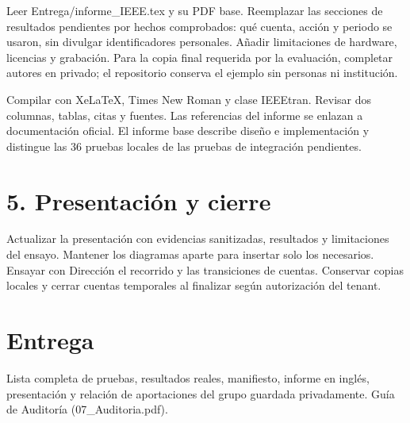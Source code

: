 \documentclass[12pt,a4paper]{article}
\begin{document}
Leer \textnormal{Entrega/\allowbreak{}informe\_\allowbreak{}IEEE.tex} y su PDF base. Reemplazar las secciones de resultados pendientes por hechos comprobados: qué cuenta, acción y periodo se usaron, sin divulgar identificadores personales. Añadir limitaciones de hardware, licencias y grabación. Para la copia final requerida por la evaluación, completar autores en privado; el repositorio conserva el ejemplo sin personas ni institución.\par
Compilar con XeLaTeX, Times New Roman y clase IEEEtran. Revisar dos columnas, tablas, citas y fuentes. Las referencias del informe se enlazan a documentación oficial. El informe base describe diseño e implementación y distingue las 36 pruebas locales de las pruebas de integración pendientes.\par
{}\section*{5. Presentación y cierre}
Actualizar la presentación con evidencias sanitizadas, resultados y limitaciones del ensayo. Mantener los diagramas aparte para insertar solo los necesarios. Ensayar con Dirección el recorrido y las transiciones de cuentas. Conservar copias locales y cerrar cuentas temporales al finalizar según autorización del tenant.\par
{}\section*{Entrega}
Lista completa de pruebas, resultados reales, manifiesto, informe en inglés, presentación y relación de aportaciones del grupo guardada privadamente. Guía de Auditoría (07\_Auditoria.pdf).\par
\end{document}
